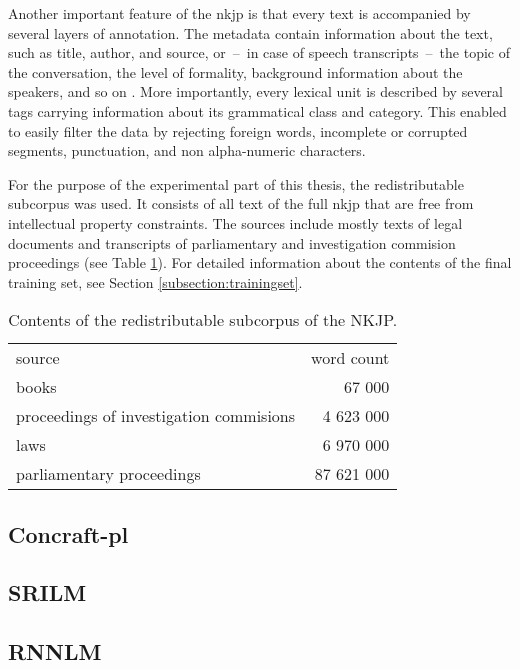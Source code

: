 Another important feature of the \gls{nkjp} is that every text is accompanied by several layers of annotation. The metadata contain information about the text, such as title, author, and source, or~--~in case of speech transcripts~--~the topic of the conversation, the level of formality, background information about the speakers, and so on \cite{przepiorkowski2009xml}. More importantly, every lexical unit is described by several tags carrying information about its grammatical class and category. This enabled to easily filter the data by rejecting foreign words, incomplete or corrupted segments, punctuation, and non alpha-numeric characters. 

For the purpose of the experimental part of this thesis, the redistributable subcorpus was used. It consists of all text of the full \gls{nkjp} that are free from intellectual property constraints. The sources include mostly texts of legal documents and transcripts of parliamentary and investigation commision proceedings (see Table \ref{table:freenkjp}). For detailed information about the contents of the final training set, see Section \ref{subsection:trainingset}.

\begin{table}[h!]
  \begin{center}
	  \caption{Contents of the redistributable subcorpus of the NKJP.}
	    \label{table:freenkjp}
	    \begin{tabular*}{.6\linewidth}{@{\extracolsep{\fill}}lr}
      source & word count \\
      \cmidrule{1-2}
      books & 67 000\\
      proceedings of investigation commisions & 4 623 000\\
      laws & 6 970 000\\
      parliamentary proceedings & 87 621 000\\
    \end{tabular*}
  \end{center}
\end{table}

\subsection{Concraft-pl}

\subsection{SRILM}
\subsection{RNNLM}
